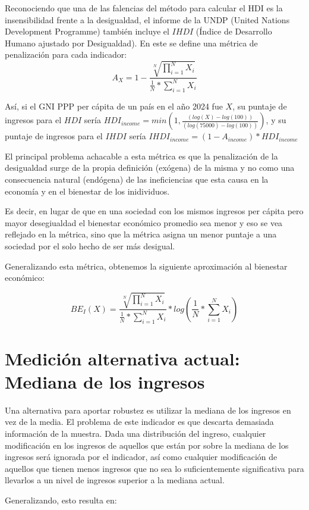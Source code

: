 Reconociendo que una de las falencias del método para calcular el HDI es la insensibilidad frente a la desigualdad, el informe de la UNDP (United Nations Development Programme) también incluye el $IHDI$ (Índice de Desarrollo Humano ajustado por Desigualdad). En este se define una métrica de penalización para cada indicador:
$$
    A_X = 1 - \frac{\sqrt[N]{\prod_{i=1}^NX_i}}{\frac{1}{N} * \sum_{i=1}^N X_i}
$$

Así, si el GNI PPP per cápita de un país en el año 2024 fue $X$, su puntaje de ingresos para el $HDI$ sería $ HDI_{income} = min(1, \frac{(log(X)-log(100))}{(log(75000)-log(100))})$, y su puntaje de ingresos para el $IHDI$ sería $IHDI_{income} = (1-A_{income}) * HDI_{income}$

El principal problema achacable a esta métrica es que la penalización de la desigualdad surge de la propia definición (exógena) de la misma y no como una consecuencia natural (endógena) de las ineficiencias que esta causa en la economía y en el bienestar de los inidividuos. 

Es decir, en lugar de que en una sociedad con los mismos ingresos per cápita pero mayor desegiualdad el bienestar económico promedio sea menor y eso se vea reflejado en la métrica, sino que la métrica asigna un menor puntaje a una sociedad por el solo hecho de ser más desigual.

Generalizando esta métrica, obtenemos la siguiente aproximación al bienestar económico:

$$
    BE_I(X) = \frac{\sqrt[N]{\prod_{i=1}^NX_i}}{\frac{1}{N} * \sum_{i=1}^N X_i} * log(\frac{1}{N} * \sum_{i=1}^{N}X_i)
$$



\section{Medición alternativa actual: Mediana de los ingresos}

Una alternativa para aportar robustez es utilizar la mediana de los ingresos en vez de la media. El problema de este indicador es que descarta demasiada información de la muestra. Dada una distribución del ingreso, cualquier modificación en los ingresos de aquellos que están por sobre la mediana de los ingresos será ignorada por el indicador, así como cualquier modificación de aquellos que tienen menos ingresos que no sea lo suficientemente significativa para llevarlos a un nivel de ingresos superior a la mediana actual.

Generalizando, esto resulta en:

